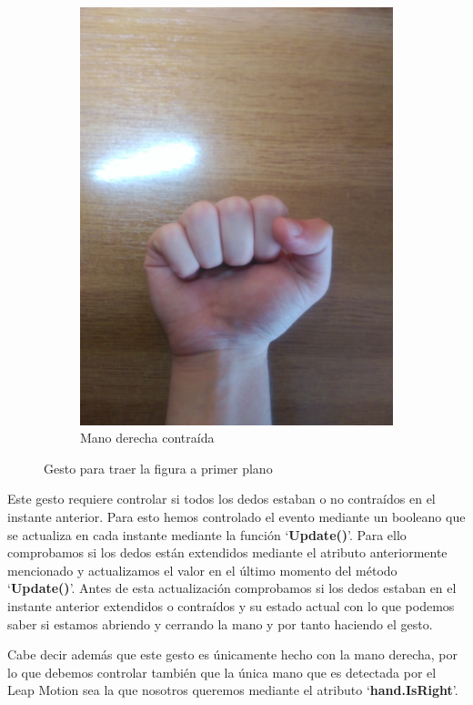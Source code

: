 \documentclass[a4paper,11pt]{article}
\begin{document}
\begin{figure}[!h]
\begin{subfigure}{0.48\textwidth}
		\includegraphics[scale=0.066]{./Imagenes/trae_da_vinci2.jpg}
		\caption{Mano derecha contraída}
	\end{subfigure}
	\caption{Gesto para traer la figura a primer plano}
	\label{gesto1}
\end{figure}

Este gesto requiere controlar si todos los dedos estaban o no contraídos en el instante anterior. Para esto hemos controlado el evento mediante un booleano que se actualiza en cada instante mediante la función `\textbf{Update()}'. Para ello comprobamos si los dedos están extendidos mediante el atributo anteriormente mencionado y actualizamos el valor en el último momento del método `\textbf{Update()}'. Antes de esta actualización comprobamos si los dedos estaban en el instante anterior extendidos o contraídos y su estado actual con lo que podemos saber si estamos abriendo y cerrando la mano y por tanto haciendo el gesto.

\vspace{10px}

Cabe decir además que este gesto es únicamente hecho con la mano derecha, por lo que debemos controlar también que la única mano que es detectada por el Leap Motion sea la que nosotros queremos mediante el atributo `\textbf{hand.IsRight}'.
\end{document}
